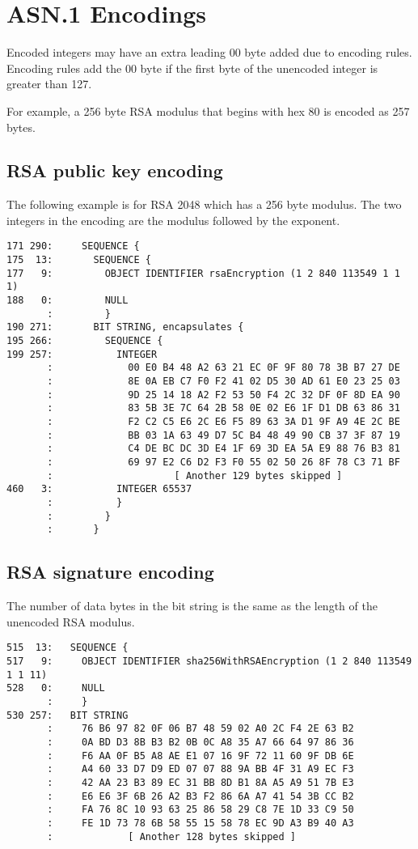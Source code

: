\documentclass[12pt]{article}
\begin{document}
\newpage
\section{ASN.1 Encodings}

\noindent
Encoded integers may have an extra leading 00 byte added due to encoding rules.
Encoding rules add the 00 byte if the first byte of the unencoded integer is greater than 127.

\bigskip
\noindent
For example, a 256 byte RSA modulus that begins with hex 80 is encoded as 257 bytes.

\newpage
\subsection*{RSA public key encoding}

\noindent
The following example is for RSA 2048 which has a 256 byte modulus.
The two integers in the encoding are the modulus followed by the exponent.

\begin{verbatim}
171 290:     SEQUENCE {
175  13:       SEQUENCE {
177   9:         OBJECT IDENTIFIER rsaEncryption (1 2 840 113549 1 1 1)
188   0:         NULL
       :         }
190 271:       BIT STRING, encapsulates {
195 266:         SEQUENCE {
199 257:           INTEGER
       :             00 E0 B4 48 A2 63 21 EC 0F 9F 80 78 3B B7 27 DE
       :             8E 0A EB C7 F0 F2 41 02 D5 30 AD 61 E0 23 25 03
       :             9D 25 14 18 A2 F2 53 50 F4 2C 32 DF 0F 8D EA 90
       :             83 5B 3E 7C 64 2B 58 0E 02 E6 1F D1 DB 63 86 31
       :             F2 C2 C5 E6 2C E6 F5 89 63 3A D1 9F A9 4E 2C BE
       :             BB 03 1A 63 49 D7 5C B4 48 49 90 CB 37 3F 87 19
       :             C4 DE BC DC 3D E4 1F 69 3D EA 5A E9 88 76 B3 81
       :             69 97 E2 C6 D2 F3 F0 55 02 50 26 8F 78 C3 71 BF
       :                     [ Another 129 bytes skipped ]
460   3:           INTEGER 65537
       :           }
       :         }
       :       }
\end{verbatim}

\subsection*{RSA signature encoding}

\noindent
The number of data bytes in the bit string is the same as the length of the unencoded RSA modulus.

\begin{verbatim}
515  13:   SEQUENCE {
517   9:     OBJECT IDENTIFIER sha256WithRSAEncryption (1 2 840 113549 1 1 11)
528   0:     NULL
       :     }
530 257:   BIT STRING
       :     76 B6 97 82 0F 06 B7 48 59 02 A0 2C F4 2E 63 B2
       :     0A BD D3 8B B3 B2 0B 0C A8 35 A7 66 64 97 86 36
       :     F6 AA 0F B5 A8 AE E1 07 16 9F 72 11 60 9F DB 6E
       :     A4 60 33 D7 D9 ED 07 07 88 9A BB 4F 31 A9 EC F3
       :     42 AA 23 B3 89 EC 31 BB 8D B1 8A A5 A9 51 7B E3
       :     E6 E6 3F 6B 26 A2 B3 F2 86 6A A7 41 54 3B CC B2
       :     FA 76 8C 10 93 63 25 86 58 29 C8 7E 1D 33 C9 50
       :     FE 1D 73 78 6B 58 55 15 58 78 EC 9D A3 B9 40 A3
       :             [ Another 128 bytes skipped ]
\end{verbatim}
\end{document}
